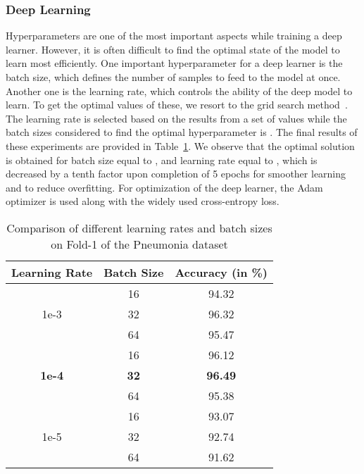 \documentclass[final,3p,times]{elsarticle}
\begin{document}
\subsubsection{Deep Learning}
Hyperparameters are one of the most {important aspects while training} a deep learner. However, it is often difficult to find the optimal state of the model to learn most efficiently. One {important} hyperparameter for a deep learner is the batch size, which defines the number of samples to {feed} to the model at {once.} Another one is the learning rate, which controls the ability of the deep model to learn. {To get the optimal values} of these, we resort to the grid search method~\cite{paul2022ensemble}. The learning rate is selected based on the results from {a} set of values  while the batch sizes considered to find the optimal hyperparameter is . The final results of these experiments are provided in Table~\ref{tab:hyper}. We observe that the optimal solution is obtained for batch size equal to , and learning rate equal to , which is decreased by a tenth factor upon completion of 5 epochs for smoother learning and to reduce overfitting. For optimization of the deep learner, the Adam optimizer is used along with the widely used cross-entropy loss.
\begin{table}[ht!]
    \centering
    \caption{Comparison of different learning rates and batch sizes on Fold-1 of the Pneumonia dataset}
    \begin{tabular}{c|c|c}
         \toprule
         Learning Rate & Batch Size & Accuracy (in \%)\\
         \midrule
         \multirow{3}{*}{1e-3} & 16 & 94.32\\
         & 32 & 96.32\\
         & 64 & 95.47\\
         \midrule
         \multirow{3}{*}{\textbf{1e-4}} & 16 & 96.12\\
         & \textbf{32} & \textbf{96.49}\\
         & 64 & 95.38\\
         \midrule
         \multirow{3}{*}{1e-5} & 16 & 93.07\\
         & 32 & 92.74\\
         & 64 & 91.62\\
         \bottomrule
    \end{tabular}
    
    \label{tab:hyper}
\end{table}
\end{document}
